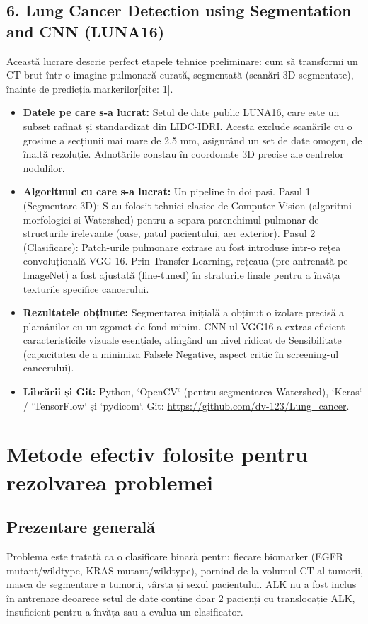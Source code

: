 \documentclass[runningheads,a4paper,11pt]{report}
\begin{document}
\section{6. Lung Cancer Detection using Segmentation and CNN (LUNA16)}
Această lucrare descrie perfect etapele tehnice preliminare: cum să transformi un CT brut într-o imagine pulmonară curată, segmentată (scanări 3D segmentate), înainte de predicția markerilor[cite: 1].
\begin{itemize}
    \item \textbf{Datele pe care s-a lucrat:} Setul de date public LUNA16, care este un subset rafinat și standardizat din LIDC-IDRI. Acesta exclude scanările cu o grosime a secțiunii mai mare de 2.5 mm, asigurând un set de date omogen, de înaltă rezoluție. Adnotările constau în coordonate 3D precise ale centrelor nodulilor.
    \item \textbf{Algoritmul cu care s-a lucrat:} Un pipeline în doi pași. Pasul 1 (Segmentare 3D): S-au folosit tehnici clasice de Computer Vision (algoritmi morfologici și Watershed) pentru a separa parenchimul pulmonar de structurile irelevante (oase, patul pacientului, aer exterior). Pasul 2 (Clasificare): Patch-urile pulmonare extrase au fost introduse într-o rețea convoluțională VGG-16. Prin Transfer Learning, rețeaua (pre-antrenată pe ImageNet) a fost ajustată (fine-tuned) în straturile finale pentru a învăța texturile specifice cancerului.
    \item \textbf{Rezultatele obținute:} Segmentarea inițială a obținut o izolare precisă a plămânilor cu un zgomot de fond minim. CNN-ul VGG16 a extras eficient caracteristicile vizuale esențiale, atingând un nivel ridicat de Sensibilitate (capacitatea de a minimiza Falsele Negative, aspect critic în screening-ul cancerului).
    \item \textbf{Librării și Git:} Python, `OpenCV` (pentru segmentarea Watershed), `Keras` / `TensorFlow` și `pydicom`. Git: \url{https://github.com/dv-123/Lung_cancer}.
\end{itemize}


\chapter{Metode efectiv folosite pentru rezolvarea problemei}
\label{chapter:metode_propuse}

\section{Prezentare generală}
Problema este tratată ca o clasificare binară pentru fiecare biomarker (EGFR mutant/wildtype, KRAS mutant/wildtype), pornind de la volumul CT al tumorii, masca de segmentare a tumorii, vârsta și sexul pacientului. ALK nu a fost inclus în antrenare deoarece setul de date conține doar 2 pacienți cu translocație ALK, insuficient pentru a învăța sau a evalua un clasificator.
\end{document}
